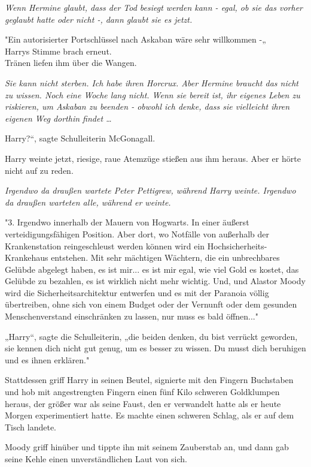 {\emph{Wenn Hermine glaubt, dass der Tod besiegt werden kann - egal, ob sie das vorher geglaubt hatte oder nicht -, dann glaubt sie es jetzt.}

"Ein autorisierter Portschlüssel nach Askaban wäre sehr willkommen -„\\ Harrys Stimme brach erneut.\\ Tränen liefen ihm über die Wangen.

\emph{Sie kann nicht sterben. Ich habe ihren Horcrux. Aber Hermine braucht das nicht zu wissen. Noch eine Woche lang nicht. Wenn sie bereit ist, ihr eigenes Leben zu riskieren, um Askaban zu beenden - obwohl ich denke, dass sie vielleicht ihren eigenen Weg dorthin findet …}

Harry?“, sagte Schulleiterin McGonagall.

Harry weinte jetzt, riesige, raue Atemzüge stießen aus ihm heraus. Aber er hörte nicht auf zu reden.

\emph{Irgendwo da draußen wartete Peter Pettigrew, während Harry weinte. Irgendwo da draußen warteten alle, während er weinte.}

"3. Irgendwo innerhalb der Mauern von Hogwarts. In einer äußerst verteidigungsfähigen Position. Aber dort, wo Notfälle von außerhalb der Krankenstation reingeschleust werden können wird ein Hochsicherheits-Krankehaus entstehen. Mit sehr mächtigen Wächtern, die ein unbrechbares Gelübde abgelegt haben, es ist mir... es ist mir egal, wie viel Gold es kostet, das Gelübde zu bezahlen, es ist wirklich nicht mehr wichtig. Und, und Alastor Moody wird die Sicherheitsarchitektur entwerfen und es mit der Paranoia völlig übertreiben, ohne sich von einem Budget oder der Vernunft oder dem gesunden Menschenverstand einschränken zu lassen, nur muss es bald öffnen..."

„Harry“, sagte die Schulleiterin, „die beiden denken, du bist verrückt geworden, sie kennen dich nicht gut genug, um es besser zu wissen. Du musst dich beruhigen und es ihnen erklären."

Stattdessen griff Harry in seinen Beutel, signierte mit den Fingern Buchstaben und hob mit angestrengten Fingern einen fünf Kilo schweren Goldklumpen heraus, der größer war als seine Faust, den er verwandelt hatte als er heute Morgen experimentiert hatte. Es machte einen schweren Schlag, als er auf dem Tisch landete.

Moody griff hinüber und tippte ihn mit seinem Zauberstab an, und dann gab seine Kehle einen unverständlichen Laut von sich.

}

